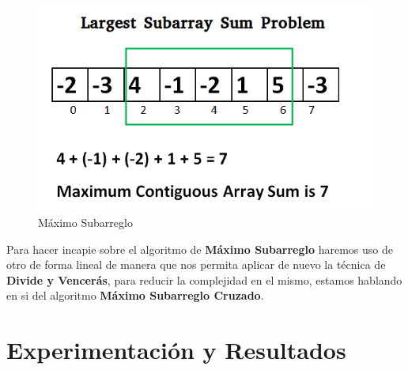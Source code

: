 \documentclass[12pt,twoside]{article}
\begin{document}
\begin{figure}[h]
  \centering
    \includegraphics[height=0.5\textwidth]{Figure1}
  \caption{Máximo Subarreglo}
  \label{fig:ejemplo1}
\end{figure}

Para hacer incapie sobre el algoritmo de \textbf{Máximo Subarreglo} haremos uso de otro de forma lineal de manera que nos permita aplicar de nuevo la técnica de \textbf{Divide y Vencerás}, para reducir la complejidad en el mismo,
estamos hablando en si del algoritmo \textbf{Máximo Subarreglo Cruzado}.

\newpage
\section{Experimentaci\'on y Resultados}
\centerline{}
\end{document}
